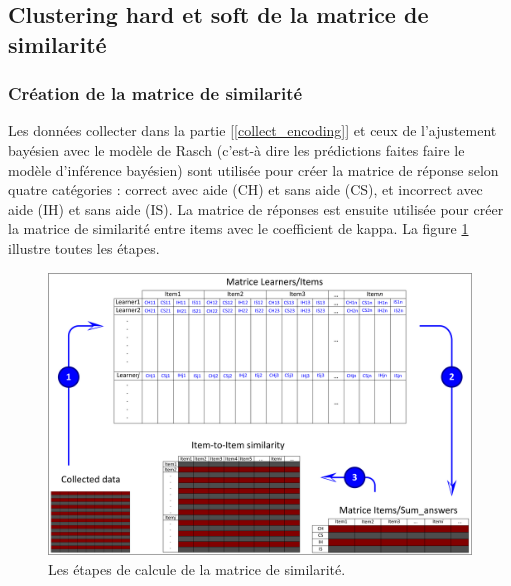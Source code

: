 \subsection{Clustering hard et soft de la matrice de similarité}

\subsubsection{Création de la matrice de similarité}
Les données collecter dans la partie [\ref{collect_encoding}] et ceux de l’ajustement bayésien avec le modèle de Rasch (c’est-à dire les prédictions faites faire le modèle d’inférence bayésien) sont utilisée pour créer la matrice de réponse selon quatre catégories : correct avec aide (CH) et sans aide (CS), et incorrect avec aide (IH) et sans aide (IS). La matrice de réponses est ensuite utilisée pour créer la matrice de similarité entre items avec le coefficient de kappa. La figure \ref{similarity_steps} illustre toutes les étapes. 

\begin{figure}[H]
	\begin{center}
		\includegraphics[width=\textwidth]{images/chapitre7/similarity_steps.png}
	\end{center}
	\caption{Les étapes de calcule de la matrice de similarité.}
	\label{similarity_steps}
\end{figure}

